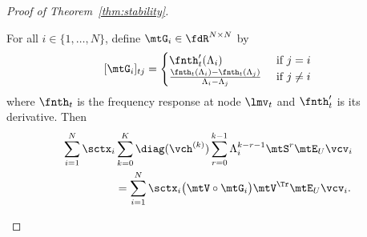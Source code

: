 \begin{proof}[Proof of Theorem~\ref{thm:stability}]
\begin{lemma}\label{lem:app:GiMatrix}
For all $i\in\{1,\dots,N\}$, define $\mtG_{i} \in \fdR^{N \times N}$ by
\begin{equation}\label{eq:app:GiMatrix}
    [\mtG_{i}]_{tj} = \begin{cases}
        \fnth_{t}'(\lambda_{i}) & \text{ if }j=i \\
        \frac{\fnth_{t}(\lambda_{i})-\fnth_{t}(\lambda_{j})}{\lambda_{i}-\lambda_{j}} & \text{ if } j \neq i
    \end{cases}
\end{equation}
where $\fnth_{t}$ is the frequency response at node $\lmv_{t}$ and $\fnth'_{t}$ is its derivative. Then
\begin{equation} \label{eq:app:outputDiffGFTfirstTermSecondSolved}
%
\begin{aligned}
    \sum_{i=1}^{N} \sctx_{i} & \sum_{k=0}^{K} \diag(\vch^{(k)}) \sum_{r=0}^{k-1}\lambda_{i}^{k-r-1}\mtS^{r} \mtE_{U} \vcv_{i} \\ & = \sum_{i=1}^{N} \sctx_{i} \big( \mtV \circ \mtG_{i} \big) \mtV^{\Tr} \mtE_{U} \vcv_{i}.
\end{aligned}
%
\end{equation}
\end{lemma}


\end{proof}
